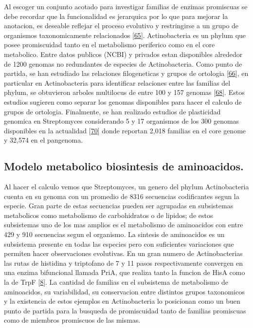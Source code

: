 \documentclass[12pt,twoside]{reedthesis}
\begin{document}
  Al escoger un conjunto acotado para investigar familias de enzimas
  promiscuas se debe recordar que la funcionalidad es jerarquica por lo
  que para mejorar la anotacion, es deseable reflejar el proceso evolutivo
  y restringirse a un grupo de organismos taxonomicamente relacionados
  {[}\protect\hyperlink{ref-cruz-moralesux5fphylogenomicux5f2016}{65}{]}.
  Actinobacteria es un phylum que posee promiscuidad tanto en el
  metabolismo periferico como en el core metabolico. Entre datos publicos
  (NCBI) y privados estan disponibles alrededor de 1200 genomas no
  redundantes de especies de Actinobacteria. Como punto de partida, se han
  estudiado las relaciones filogeneticas y grupos de ortologia
  {[}\protect\hyperlink{ref-liux5forthomclux5f2003}{66}{]}, en particular
  en Actinobacteria para identificar relaciones entre las familias del
  phylum, se obtuvieron arboles multilocus de entre 100 y 157 genomas
  {[}\protect\hyperlink{ref-gaoux5fphylogeneticux5f2012}{68}{]}. Estos
  estudios sugieren como separar los genomas disponibles para hacer el
  calculo de grupos de ortologia. Finalmente, se han realizado estudios de
  plasticidad genomica en Streptomyces considerando 5 y 17 organismos de
  los 300 genomas disponibles en la actualidad
  {[}\protect\hyperlink{ref-zhouux5fgenomeux5f2012}{70}{]} donde reportan
  2,018 familias en el core genome y 32,574 en el pangenoma.
  
  \subsection{Modelo metabolico biosintesis de
  aminoacidos.}\label{modelo-metabolico-biosintesis-de-aminoacidos.}
  
  Al hacer el calculo vemos que Streptomyces, un genero del phylum
  Actinobacteria cuenta en su genoma con un promedio de 8316 secuencias
  codificantes segun la especie. Gran parte de estas secuencias pueden ser
  agrupadas en subsistemas metabolicos como metabolismo de carbohidratos o
  de lipidos; de estos subsistemas uno de los mas amplios es el
  metabolismo de aminoacidos con entre 429 y 910 secuencias segun el
  organismo. La sintesis de aminoacidos es un subsistema presente en todas
  las especies pero con suficientes variaciones que permiten hacer
  observaciones evolutivas. En un gran numero de Actinobacterias las rutas
  de histidina y triptofano de 7 y 11 pasos respectivamente convergen en
  una enzima bifuncional llamada PriA, que realiza tanto la funcion de
  HisA como la de TrpF
  {[}\protect\hyperlink{ref-baronagomezux5foccurrenceux5f2003}{8}{]}. La
  cantidad de familias en el subsistema de metabolismo de aminoacidos, su
  variabilidad, su conservacion entre distintos grupos taxonomicos y la
  existencia de estos ejemplos en Actinobacteria lo posicionan como un
  buen punto de partida para la busqueda de promiscuidad tanto de familias
  promiscuas como de miembros promiscuos de las mismas.
  
\end{document}
